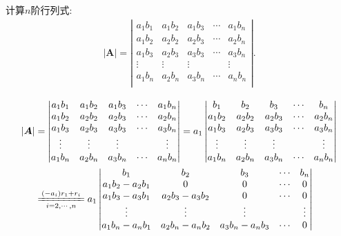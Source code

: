 \documentclass[../../main.tex]{subfiles}%
\begin{document}
\begin{example}
计算$n$阶行列式:
\begin{gather}
|\boldsymbol{A}|=\left| \begin{matrix}
a_1b_1&		a_1b_2&		a_1b_3&		\cdots&		a_1b_n\\
a_1b_2&		a_2b_2&		a_2b_3&		\cdots&		a_2b_n\\
a_1b_3&		a_2b_3&		a_3b_3&		\cdots&		a_3b_n\\
\vdots&		\vdots&		\vdots&		&		\vdots\\
a_1b_n&		a_2b_n&		a_3b_n&		\cdots&		a_nb_n\\
\end{matrix} \right|.
\nonumber
\end{gather}
\begin{solution}
\begin{align*}
|\boldsymbol{A}|&=\left| \begin{matrix}
a_1b_1&		a_1b_2&		a_1b_3&		\cdots&		a_1b_n\\
a_1b_2&		a_2b_2&		a_2b_3&		\cdots&		a_2b_n\\
a_1b_3&		a_2b_3&		a_3b_3&		\cdots&		a_3b_n\\
\vdots&		\vdots&		\vdots&		&		\vdots\\
a_1b_n&		a_2b_n&		a_3b_n&		\cdots&		a_nb_n\\
\end{matrix} \right|=a_1\left| \begin{matrix}
b_1&		b_2&		b_3&		\cdots&		b_n\\
a_1b_2&		a_2b_2&		a_2b_3&		\cdots&		a_2b_n\\
a_1b_3&		a_2b_3&		a_3b_3&		\cdots&		a_3b_n\\
\vdots&		\vdots&		\vdots&		&		\vdots\\
a_1b_n&		a_2b_n&		a_3b_n&		\cdots&		a_nb_n\\
\end{matrix} \right|
\\
&\xlongequal[i=2,\cdots ,n]{\left( -a_i \right) r_1+r_i}a_1\left| \begin{matrix}
b_1&		b_2&		b_3&		\cdots&		b_n\\
a_1b_2-a_2b_1&		0&		0&		\cdots&		0\\
a_1b_3-a_3b_1&		a_2b_3-a_3b_2&		0&		\cdots&		0\\
\vdots&		\vdots&		\vdots&		&		\vdots\\
a_1b_n-a_nb_1&		a_2b_n-a_nb_2&		a_3b_n-a_nb_3&		\cdots&		0\\
\end{matrix} \right|

\end{align*}
\end{solution}
\end{example}
\end{document}
